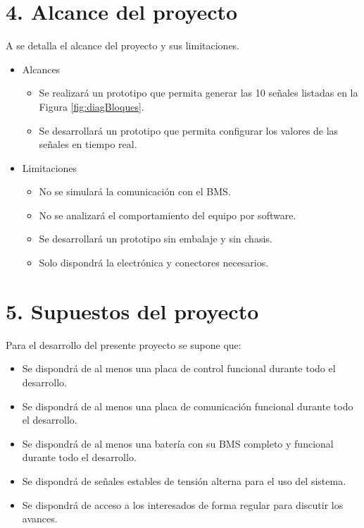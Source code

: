 \documentclass[
11pt, %
codirector, %
]{charter}
\begin{document}
\section{4. Alcance del proyecto}
\label{sec:alcance}
A  se detalla el alcance del proyecto y sus limitaciones.
\begin{itemize}
	\item Alcances
	      \begin{itemize}
		      \item Se realizará un prototipo que permita generar las 10 señales listadas en la Figura \ref{fig:diagBloques}.
		      \item Se desarrollará un prototipo que permita configurar los valores de las señales en tiempo real.
	      \end{itemize}
	\item Limitaciones
	      \begin{itemize}
		      \item No se simulará la comunicación con el BMS.
		      \item No se analizará el comportamiento del equipo por software.
		      \item Se desarrollará un prototipo sin embalaje y sin chasis.
		      \item Solo dispondrá la electrónica y conectores necesarios.
	      \end{itemize}
\end{itemize}


\section{5. Supuestos del proyecto}
\label{sec:supuestos}

Para el desarrollo del presente proyecto se supone que:
\begin{itemize}
	\item Se dispondrá de al menos una placa de control funcional durante todo el desarrollo.
	\item Se dispondrá de al menos una placa de comunicación funcional durante todo el desarrollo.
	\item Se dispondrá de al menos una batería con su BMS completo y funcional durante todo el desarrollo.
	\item Se dispondrá de señales estables de tensión alterna para el uso del sistema.
	\item Se dispondrá de acceso a los interesados de forma regular para discutir los avances.

\end{itemize}
\end{document}
